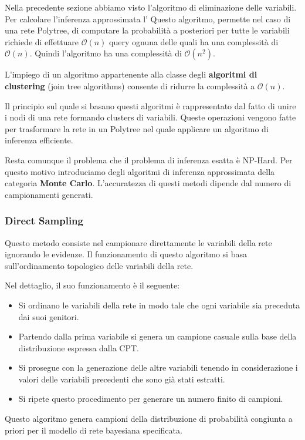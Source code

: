 Nella precedente sezione abbiamo visto l'algoritmo di eliminazione delle
variabili. Per calcolare l'inferenza approssimata l' Questo algoritmo, permette nel caso di una rete Polytree, di computare
la probabilità a posteriori per tutte le variabili richiede di effettuare $\mathcal{O}(n)$
query ognuna delle quali ha una complessità di $\mathcal{O}(n)$. Quindi l'algoritmo
ha una complessità di $\mathcal{O}(n^2)$.

L'impiego di un algoritmo appartenente alla classe degli \textbf{algoritmi di
    clustering} (join tree algorithms) consente di ridurre la complessità a $\mathcal{O}(n)$.

Il principio sul quale si basano questi algoritmi è rappresentato dal fatto di
unire i nodi di una rete formando clusters di variabili. Queste operazioni vengono
fatte per trasformare la rete in un Polytree nel quale applicare un algoritmo di
inferenza efficiente.

Resta comunque il problema che il problema di inferenza esatta è NP-Hard. Per
questo motivo introduciamo degli algoritmi di inferenza approssimata della categoria
\textbf{Monte Carlo}. L'accuratezza di questi metodi dipende dal numero di campionamenti
generati.
\subsubsection{Direct Sampling}
Questo metodo consiste nel campionare direttamente le variabili della rete ignorando
le evidenze. Il funzionamento di questo algoritmo si basa sull'ordinamento
topologico delle variabili della rete.

Nel dettaglio, il suo funzionamento è il seguente:
\begin{itemize}
    \item Si ordinano le variabili della rete in modo tale che ogni variabile
          sia preceduta dai suoi genitori.
    \item Partendo dalla prima variabile si genera un campione casuale sulla base
          della distribuzione espressa dalla CPT.
    \item Si prosegue con la generazione delle altre variabili tenendo in
          considerazione i valori delle variabili precedenti che sono già stati
          estratti.
    \item Si ripete questo procedimento per generare un numero finito di campioni.
\end{itemize}
Questo algoritmo genera campioni della distribuzione di probabilità congiunta a
priori per il modello di rete bayesiana specificata.


